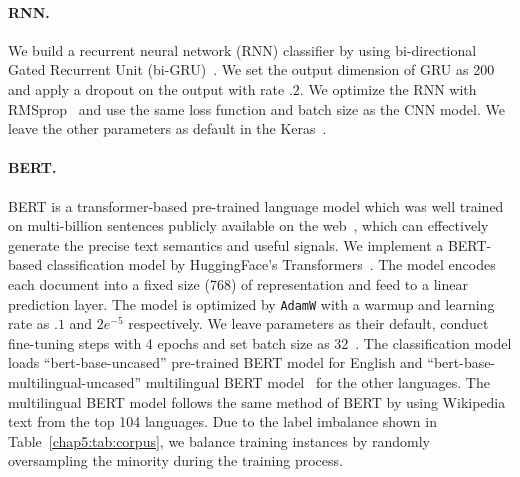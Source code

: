\paragraph{RNN.}
We build a recurrent neural network (RNN) classifier by using bi-directional Gated Recurrent Unit (bi-GRU)~\cite{chung2014empirical,park2018reducing}.
We set the output dimension of GRU as 200 and apply a dropout on the output with rate $.2$.
We optimize the RNN with RMSprop~\cite{tieleman2012lecture} and use the same loss function and batch size as the CNN model.
We leave the other parameters as default in the Keras~\cite{chollet2015keras}.


\paragraph{BERT.}
BERT is a transformer-based pre-trained language model which was well trained on multi-billion sentences publicly available on the web~\cite{devlin2019bert}, which can effectively generate the precise text semantics and useful signals.
We implement a BERT-based classification model by HuggingFace's Transformers~\cite{Wolf2019HuggingFacesTS}.
The model encodes each document into a fixed size (768) of representation and feed to a linear prediction layer.
The model is optimized by \texttt{AdamW} with a warmup and learning rate as $.1$ and $2e^{-5}$ respectively.
We leave parameters as their default, conduct fine-tuning steps with 4 epochs and set batch size as 32~\cite{sun2019fine}.
The classification model loads ``bert-base-uncased'' pre-trained BERT model for English and ``bert-base-multilingual-uncased'' multilingual BERT model~\cite{gertner2019mitre} for the other languages.
The multilingual BERT model follows the same method of BERT by using Wikipedia text from the top 104 languages.
Due to the label imbalance shown in Table~\ref{chap5:tab:corpus}, we balance training instances by randomly oversampling the minority during the training process.


